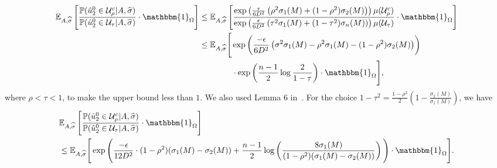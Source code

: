 \documentclass{article}
\newcommand{\mprob}{\mathbb{P}}
\newcommand{\sigmahat}{\ensuremath{\widehat{\sigma}}}
\begin{document}
\begin{align*}
\mathbb{E}_{A, \sigmahat}\left[\frac{\mprob(\hat{u}_2^0 \in \mathcal{U}^c_\rho|A, \sigmahat)}{\mprob(\hat{u}_2^0 \in \mathcal{U}_\tau|A, \sigmahat)}\cdot \mathbbm{1}_{\Omega}\right] &\leq \mathbb{E}_{A, \sigmahat}\left[\frac{\exp\left(\frac{\epsilon}{6D^2} \left(\rho^2 \sigma_1(M) + (1-\rho^2)\sigma_2(M)\right)\right) \mu(\mathcal{U}^c_\rho)}{\exp\left(\frac{\epsilon}{6D^2} \left(\tau^2 \sigma_1(M) + (1-\tau^2) \sigma_n(M)\right)\right) \mu(\mathcal{U}_\tau)}\cdot \mathbbm{1}_{\Omega}\right]\\
&\leq \mathbb{E}_{A, \sigmahat}\Bigg[\exp\left(\frac{-\epsilon}{6D^2} \left(\sigma^2 \sigma_1(M) - \rho^2 \sigma_1(M) - (1-\rho^2) \sigma_2(M)\right)\right) \\
& \qquad \qquad \cdot \exp\left(\frac{n-1}{2} \log\frac{2}{1-\tau}\right)\cdot \mathbbm{1}_{\Omega}\Bigg],
\end{align*}
where $\rho < \tau < 1$, to make the upper bound less than $1$. We also used Lemma $6$ in~\cite{ChaEtal13}. For the choice $1 - \tau^2 = \frac{1-\rho^2}{2} \left(1-\frac{\sigma_2(M)}{\sigma_1(M)}\right)$, we have 
\begin{align*}
&\mathbb{E}_{A, \sigmahat}\left[\frac{\mprob(\hat{u}_2^0 \in \mathcal{U}^c_\rho|A, \sigmahat)}{\mprob(\hat{u}_2^0 \in \mathcal{U}_\tau|A, \sigmahat)}\cdot \mathbbm{1}_{\Omega}\right]\\
&\leq \mathbb{E}_{A, \sigmahat}\Bigg[\exp\Bigg(\frac{-\epsilon}{12D^2} \cdot (1-\rho^2)(\sigma_1(M) - \sigma_2(M)) + \frac{n-1}{2} \log\left(\frac{8\sigma_1(M)}{(1-\rho^2)(\sigma_1(M) - \sigma_2(M))}\right)\Bigg)\cdot \mathbbm{1}_{\Omega}\Bigg].
\end{align*}
\end{document}
